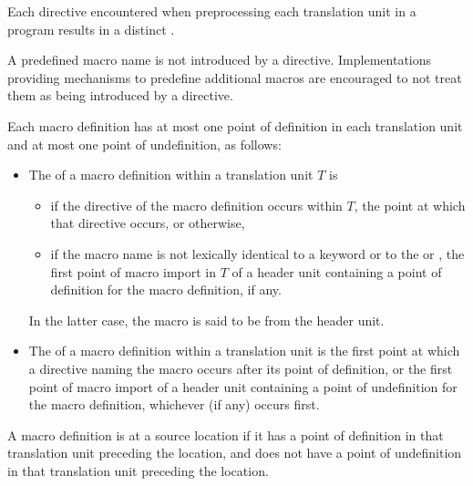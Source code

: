 \pnum
Each  directive encountered when preprocessing
each translation unit in a program results in a distinct
.
\begin{note}
A predefined macro name
is not introduced by a  directive.
Implementations providing mechanisms to predefine additional macros
are encouraged to not treat them
as being introduced by a  directive.
\end{note}
Each macro definition has at most one point of definition in
each translation unit and at most one point of undefinition, as follows:
\begin{itemize}
\item
{}%
The 
of a macro definition within a translation unit $T$ is
\begin{itemize}
\item
if the  directive of the macro definition occurs within $T$,
the point at which that directive occurs, or otherwise,
\item
if the macro name is not lexically identical to a keyword
or to the   or ,
the first point of macro import in $T$ of a header unit
containing a point of definition for the macro definition, if any.
\end{itemize}
In the latter case, the macro is said
to be  from the header unit.

\item
{}%
The 
of a macro definition within a translation unit
is the first point at which a  directive naming the macro occurs
after its point of definition, or the first point
of macro import of a header unit containing a point of undefinition for the
macro definition, whichever (if any) occurs first.
\end{itemize}

\pnum
{}%
A macro definition is  at a source location
if it has a point of definition in that translation unit preceding the location,
and does not have a point of undefinition in that translation unit preceding
the location.

